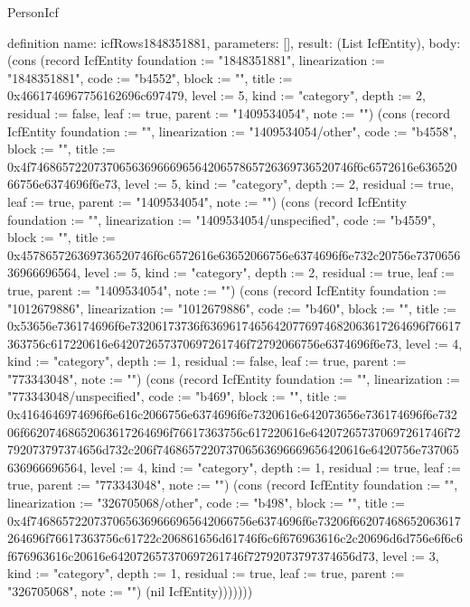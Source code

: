 \begin{lexlean}{PersonIcf}
\begin{semanticmodule}
definition{
  name: icfRows1848351881,
  parameters: [],
  result: (List IcfEntity),
  body: (cons (record IcfEntity {foundation := "1848351881", linearization := "1848351881", code := "b4552", block := "", title := 0x4661746967756162696c697479, level := 5, kind := "category", depth := 2, residual := false, leaf := true, parent := "1409534054", note := ""}) (cons (record IcfEntity {foundation := "", linearization := "1409534054/other", code := "b4558", block := "", title := 0x4f746865722073706563696669656420657865726369736520746f6c6572616e63652066756e6374696f6e73, level := 5, kind := "category", depth := 2, residual := true, leaf := true, parent := "1409534054", note := ""}) (cons (record IcfEntity {foundation := "", linearization := "1409534054/unspecified", code := "b4559", block := "", title := 0x457865726369736520746f6c6572616e63652066756e6374696f6e732c20756e737065636966696564, level := 5, kind := "category", depth := 2, residual := true, leaf := true, parent := "1409534054", note := ""}) (cons (record IcfEntity {foundation := "1012679886", linearization := "1012679886", code := "b460", block := "", title := 0x53656e736174696f6e73206173736f63696174656420776974682063617264696f76617363756c617220616e642072657370697261746f72792066756e6374696f6e73, level := 4, kind := "category", depth := 1, residual := false, leaf := true, parent := "773343048", note := ""}) (cons (record IcfEntity {foundation := "", linearization := "773343048/unspecified", code := "b469", block := "", title := 0x4164646974696f6e616c2066756e6374696f6e7320616e642073656e736174696f6e73206f66207468652063617264696f76617363756c617220616e642072657370697261746f72792073797374656d732c206f746865722073706563696669656420616e6420756e737065636966696564, level := 4, kind := "category", depth := 1, residual := true, leaf := true, parent := "773343048", note := ""}) (cons (record IcfEntity {foundation := "", linearization := "326705068/other", code := "b498", block := "", title := 0x4f74686572207370656369666965642066756e6374696f6e73206f66207468652063617264696f76617363756c61722c206861656d61746f6c6f676963616c2c20696d6d756e6f6c6f676963616c20616e642072657370697261746f72792073797374656d73, level := 3, kind := "category", depth := 1, residual := true, leaf := true, parent := "326705068", note := ""}) (nil IcfEntity)))))))
}


\end{semanticmodule}
\end{lexlean}
